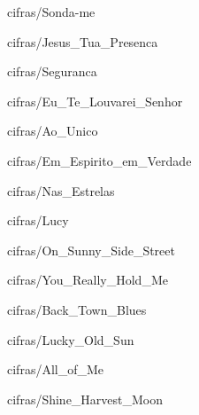 \documentclass{scrartcl}
\begin{document}

{cifras/Sonda-me}


{cifras/Jesus_Tua_Presenca}


{cifras/Seguranca}


{cifras/Eu_Te_Louvarei_Senhor}


{cifras/Ao_Unico}


{cifras/Em_Espirito_em_Verdade}


{cifras/Nas_Estrelas}


{cifras/Lucy}


{cifras/On_Sunny_Side_Street}


{cifras/You_Really_Hold_Me}


{cifras/Back_Town_Blues}


{cifras/Lucky_Old_Sun}


{cifras/All_of_Me}


{cifras/Shine_Harvest_Moon}

% 

% 
\end{document}
